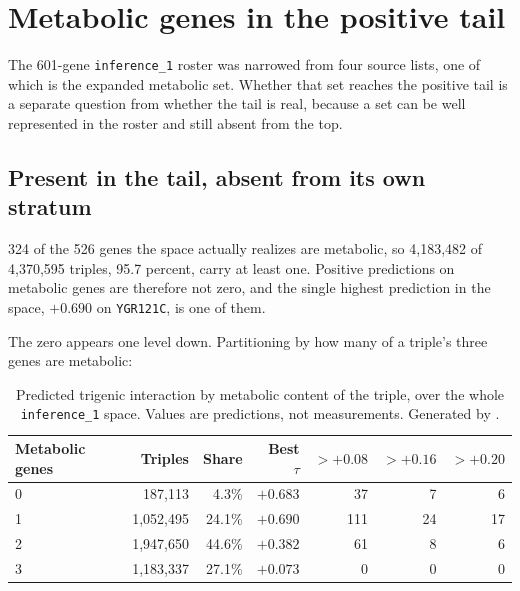 
\section{Metabolic genes in the positive tail}

The 601-gene \texttt{inference\_1} roster was narrowed from four source lists,
one of which is the expanded metabolic set. Whether that set reaches the positive
tail is a separate question from whether the tail is real, because a set can be
well represented in the roster and still absent from the top.

\subsection{Present in the tail, absent from its own stratum}

324 of the 526 genes the space actually realizes are metabolic, so 4{,}183{,}482
of 4{,}370{,}595 triples, 95.7 percent, carry at least one. Positive predictions
on metabolic genes are therefore not zero, and the single highest prediction in
the space, $+0.690$ on \texttt{YGR121C}, is one of them.

The zero appears one level down. Partitioning by how many of a triple's three
genes are metabolic:

\begin{table}[H]
\centering
\footnotesize
\begin{tabular}{lrrrrrr}
\toprule
Metabolic genes & Triples & Share & Best $\tau$ & $>+0.08$ & $>+0.16$ & $>+0.20$ \\
\midrule
0 & 187{,}113    & 4.3\%  & $+0.683$ & 37  & 7  & 6 \\
1 & 1{,}052{,}495 & 24.1\% & $+0.690$ & 111 & 24 & 17 \\
2 & 1{,}947{,}650 & 44.6\% & $+0.382$ & 61  & 8  & 6 \\
3 & 1{,}183{,}337 & 27.1\% & $+0.073$ & 0   & 0  & 0 \\
\bottomrule
\end{tabular}
\caption{Predicted trigenic interaction by metabolic content of the triple, over
the whole \texttt{inference\_1} space. Values are predictions, not measurements.
Generated by
\protect{}.}
\end{table}

